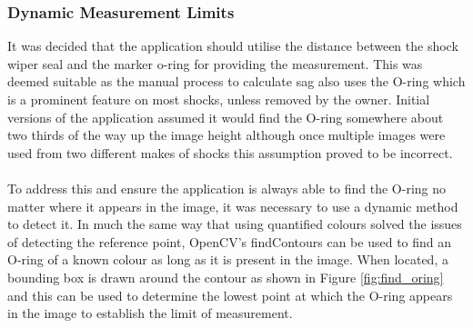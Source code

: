 		\subsubsection{Dynamic Measurement Limits}
			It was decided that the application should utilise the distance between the shock wiper seal and the marker o-ring for providing the measurement. This was deemed suitable as the manual process to calculate sag also uses the O-ring which is a prominent feature on most shocks, unless removed by the owner. Initial versions of the application assumed it would find the O-ring somewhere about two thirds of the way up the image height although once multiple images were used from two different makes of shocks this assumption proved to be incorrect.
			\\\\
			To address this and ensure the application is always able to find the O-ring no matter where it appears in the image, it was necessary to use a dynamic method to detect it. In much the same way that using quantified colours solved the issues of detecting the reference point, OpenCV’s findContours can be used to find an O-ring of a known colour as long as it is present in the image. When located, a bounding box is drawn around the contour as shown in Figure \ref{fig:find_oring} and this can be used to determine the lowest point at which the O-ring appears in the image to establish the limit of measurement.
